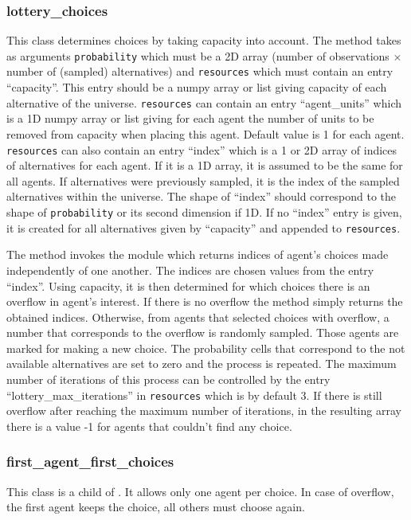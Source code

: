 \subsubsection{lottery_choices}
%
This class determines choices by taking capacity into account. The
 method takes as arguments \verb|probability| which must be a 2D
array (number of observations $\times$ number of (sampled) alternatives) and
\verb|resources| which must contain an entry ``capacity''. This entry should
be a numpy array or list giving capacity of each alternative of the universe.
\verb|resources| can contain an entry ``agent_units'' which is a 1D numpy array
or list giving for each agent the number of units to be removed from capacity
when placing this agent. Default value is 1 for each agent.  \verb|resources|
can also contain an entry ``index'' which is a 1 or 2D array of indices of
alternatives for each agent. If it is a 1D array, it is assumed to be the same
for all agents. If alternatives were previously sampled, it is the index of
the sampled alternatives within the universe. The shape of ``index'' should
correspond to the shape of \verb|probability| or its second dimension if 1D.
If no ``index'' entry is given, it is created for all alternatives given by
``capacity'' and appended to \verb|resources|.

The  method invokes the  module
which returns indices of agent's
choices made independently of one another.  The indices are chosen
values from the entry ``index''. Using capacity, it is then
determined for which choices there is an overflow in agent's
interest. If there is no overflow the method simply returns the
obtained indices. Otherwise, from agents that selected choices with
overflow, a number that corresponds to the overflow is randomly
sampled. Those agents are marked for making a new choice.  The
probability cells that correspond to the not available alternatives
are set to zero and the process is repeated.  The maximum number of
iterations of this process can be controlled by the entry
``lottery_max_iterations'' in \verb|resources| which is by default
3. If there is still overflow after reaching the maximum number of
iterations, in the resulting array there is a value -1 for agents
that couldn't find any choice.


\subsubsection{first_agent_first_choices}
%
This class is a child of . 
It allows only one agent per
choice. In case of overflow, the first agent keeps the choice, all others must
choose again.


